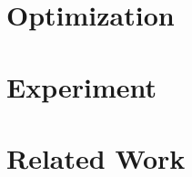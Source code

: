\documentclass{llncs}
\begin{document}
\section{Optimization}\label{sec:minimization}



\section{Experiment}\label{sec:experiment}


\section{Related Work}\label{sec:related-work}





\end{document}
